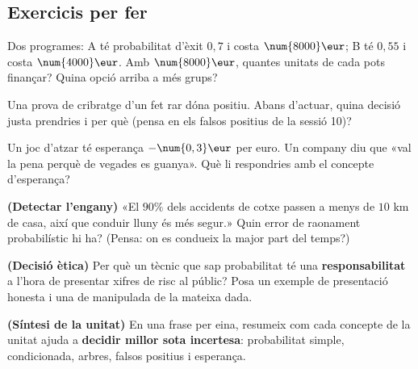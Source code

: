 \subsection{Exercicis per fer}

\begin{exercicis}
\begin{exlist}
  \item Dos programes: A té probabilitat d'èxit $0,7$ i costa $\num{8000}\eur$; B té
        $0,55$ i costa $\num{4000}\eur$. Amb $\num{8000}\eur$, quantes unitats de cada
        pots finançar? Quina opció arriba a més grups?
  \item Una prova de cribratge d'un fet rar dóna positiu. Abans d'actuar, quina decisió
        justa prendries i per què (pensa en els falsos positius de la sessió 10)?
  \item Un joc d'atzar té esperança $-\num{0,3}\eur$ per euro. Un company diu que «val la
        pena perquè de vegades es guanya». Què li respondries amb el concepte
        d'esperança?
  \item \textbf{(Detectar l'engany)} «El $90\%$ dels accidents de cotxe passen a menys de
        $\num{10}$ km de casa, així que conduir lluny és més segur.» Quin error de
        raonament probabilístic hi ha? (Pensa: on es condueix la major part del temps?)
  \item \textbf{(Decisió ètica)} Per què un tècnic que sap probabilitat té una
        \textbf{responsabilitat} a l'hora de presentar xifres de risc al públic? Posa un
        exemple de presentació honesta i una de manipulada de la mateixa dada.
  \item \textbf{(Síntesi de la unitat)} En una frase per eina, resumeix com cada concepte
        de la unitat ajuda a \textbf{decidir millor sota incertesa}: probabilitat simple,
        condicionada, arbres, falsos positius i esperança.
\end{exlist}
\end{exercicis}

